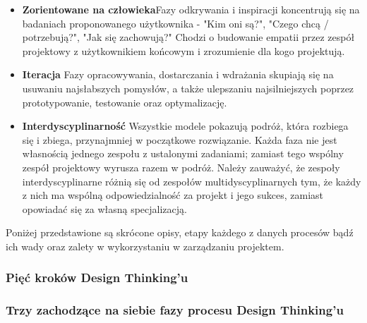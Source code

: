 \documentclass[a4paper,titleauthor]{mwart}
\begin{document}
 \begin{itemize}
	\item \textbf{Zorientowane na człowieka}\newline \newline Fazy odkrywania i inspiracji koncentrują się na badaniach proponowanego użytkownika - "Kim oni są?", "Czego chcą / potrzebują?", "Jak się zachowują?" Chodzi o budowanie empatii przez zespół projektowy z użytkownikiem końcowym i zrozumienie dla kogo projektują.\newline
	\item \textbf{Iteracja} \newline \newline Fazy opracowywania, dostarczania i wdrażania skupiają się na usuwaniu najsłabszych pomysłów, a także ulepszaniu najsilniejszych poprzez prototypowanie, testowanie oraz optymalizację.\newline
	\item \textbf{Interdyscyplinarność} \newline \newline Wszystkie modele pokazują podróż, która rozbiega się i zbiega, przynajmniej w początkowe rozwiązanie. Każda faza nie jest własnością jednego zespołu z ustalonymi zadaniami; zamiast tego wspólny zespół projektowy wyrusza razem w podróż. Należy zauważyć, że zespoły interdyscyplinarne różnią się od zespołów multidyscyplinarnych tym, że każdy z nich ma wspólną odpowiedzialność za projekt i jego sukces, zamiast opowiadać się za własną specjalizacją.
 \end{itemize}

Poniżej przedstawione są skrócone opisy, etapy każdego z danych procesów bądź ich wady oraz zalety w wykorzystaniu w zarządzaniu projektem.
 
 \subsubsection{Pięć kroków Design Thinking'u}


 \subsubsection{Trzy zachodzące na siebie fazy procesu Design Thinking'u}
 
\end{document}
